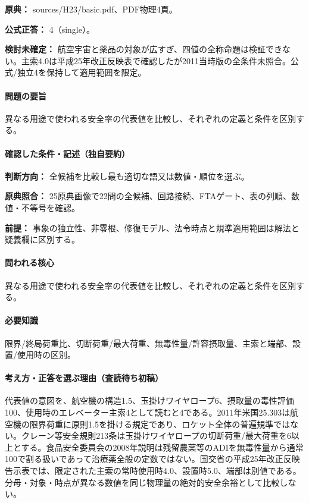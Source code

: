 \noindent\textbf{原典：} sources/H23/basic.pdf、PDF物理4頁。

\textbf{公式正答：} 4（single）。

\par\textbf{検討未確定：} 航空宇宙と薬品の対象が広すぎ、四値の全称命題は検証できない。主索4.0は平成25年改正反映表で確認したが2011当時版の全条件未照合。公式/独立4を保持して適用範囲を限定。

\paragraph{問題の要旨} 異なる用途で使われる安全率の代表値を比較し、それぞれの定義と条件を区別する。

\paragraph{確認した条件・記述（独自要約）}\mbox{}\par

\noindent\textbf{判断方向：} 全候補を比較し最も適切な語又は数値・順位を選ぶ。\par

\noindent\textbf{原典照合：} 25原典画像で22問の全候補、回路接続、FTAゲート、表の列順、数値・不等号を確認。\par

\noindent\textbf{前提：} 事象の独立性、非零根、修復モデル、法令時点と規準適用範囲は解法と疑義欄に区別する。\par

\paragraph{問われる核心} 異なる用途で使われる安全率の代表値を比較し、それぞれの定義と条件を区別する。

\paragraph{必要知識} 限界/終局荷重比、切断荷重/最大荷重、無毒性量/許容摂取量、主索と端部、設置/使用時の区別。

\paragraph{考え方・正答を選ぶ理由（査読待ち初稿）} 代表値の意図を、航空機の構造1.5、玉掛けワイヤロープ6、摂取量の毒性評価100、使用時のエレベーター主索4として読むと4である。2011年米国25.303は航空機の限界荷重に原則1.5を掛ける規定であり、ロケット全体の普遍規準ではない。クレーン等安全規則213条は玉掛けワイヤロープの切断荷重/最大荷重を6以上とする。食品安全委員会の2008年説明は残留農薬等のADIを無毒性量から通常100で割る扱いであって治療薬全般の定数ではない。国交省の平成25年改正反映告示表では、限定された主索の常時使用時4.0、設置時5.0、端部は別値である。分母・対象・時点が異なる数値を同じ物理量の絶対的安全余裕として比較しない。

